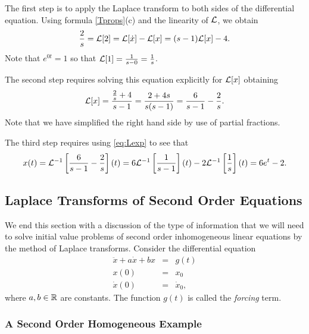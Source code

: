 \documentclass{ximera}
\begin{document}
The first step is to apply the Laplace transform to both sides of the 
differential equation.  Using formula \eqref{Tprops}(c) and the linearity of 
${\cal L}$, we obtain
\[
\frac{2}{s} = {\cal L}[2] = {\cal L}[\dot x]-{\cal L}[x] = 
(s-1){\cal L}[x]-4.
\]
Note that $e^{0t}=1$ so that ${\cal L}[1] = \frac{1}{s-0}=\frac{1}{s}$.

The second step requires solving this equation explicitly for ${\cal L}[x]$
obtaining
\begin{equation}  \label{eq:Lapdxx2}
{\cal L}[x] = \frac{\frac{2}{s}+4}{s-1} = \frac{2+4s}{s(s-1)}
= \frac{6}{s-1} - \frac{2}{s}.
\end{equation}
Note that we have simplified the right hand side by use of partial fractions.

The third step requires using \eqref{eq:Lexp} to see that
\[
x(t) = {\cal L}^{-1}\left[\frac{6}{s-1} - \frac{2}{s}\right](t) = 
6{\cal L}^{-1}\left[\frac{1}{s-1}\right](t) -
2{\cal L}^{-1}\left[\frac{1}{s}\right](t) = 6e^t-2.
\]


\subsection*{Laplace Transforms of Second Order Equations}

We end this section with a discussion of the type of information that
we will need to solve initial value problems of second order inhomogeneous 
 linear equations by the method of Laplace transforms. 
Consider the differential equation
\begin{equation}  \label{e:2ndforced}
\begin{array}{rcl} 
\ddot{x} + a\dot{x} + bx & = & g(t)\\
x(0) & = & x_0\\
\dot{x}(0) & = & \dot{x}_0,
\end{array}
\end{equation}
where $a,b\in\mbox{$\Bbb{R}$}$ are constants.  The function $g(t)$ is called the 
{\em forcing\/} term. 

\subsubsection*{A Second Order Homogeneous Example}
\end{document}
